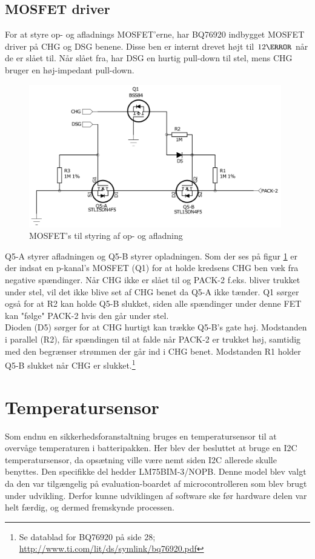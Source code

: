 \subsection{MOSFET driver}
For at styre op- og afladnings MOSFET'erne, har BQ76920 indbygget MOSFET driver på CHG og DSG benene. Disse ben er internt drevet højt til $12\volt$ når de er slået til. Når slået fra, har DSG en hurtig pull-down til stel, mens CHG bruger en høj-impedant pull-down. 

\begin{figure}[h]
	\centering
	\includegraphics[width=11cm]{billeder/bq_fets.png}
	\caption{MOSFET's til styring af op- og afladning}
	\label{fig:bq_fets}
\end{figure}

Q5-A styrer afladningen og Q5-B styrer opladningen. Som der ses på figur \ref{fig:bq_fets} er der indsat en p-kanal's MOSFET (Q1) for at holde kredsens CHG ben væk fra negative spændinger. Når CHG ikke er slået til og PACK-2 f.eks. bliver trukket under stel, vil det ikke blive set af CHG benet da Q5-A ikke tænder. Q1 sørger også for at R2 kan holde Q5-B slukket, siden alle spændinger under denne FET kan "følge" \space PACK-2 hvis den går under stel. \\

Dioden (D5) sørger for at CHG hurtigt kan trække Q5-B's gate høj. Modstanden i parallel (R2), får spændingen til at falde når PACK-2 er trukket høj, samtidig med den begrænser strømmen der går ind i CHG benet. Modstanden R1 holder Q5-B slukket når CHG er slukket.\footnote{Se datablad for BQ76920 på side 28; \url{http://www.ti.com/lit/ds/symlink/bq76920.pdf}}

\section{Temperatursensor} \label{sec:temperatur}
Som endnu en sikkerhedsforanstaltning bruges en temperatursensor til at overvåge temperaturen i batteripakken. Her blev der besluttet at bruge en I2C temperatursensor, da opsætning ville være nemt siden I2C allerede skulle benyttes. Den specifikke del hedder LM75BIM-3/NOPB. Denne model blev valgt da den var tilgængelig på evaluation-boardet af microcontrolleren som blev brugt under udvikling. Derfor kunne udviklingen af software ske før hardware delen var helt færdig, og dermed fremskynde processen. \\ 


